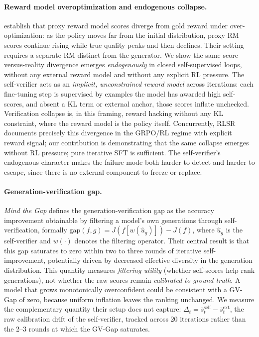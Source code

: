 \documentclass{article}
\begin{document}
\paragraph{Reward model overoptimization and endogenous collapse.}
\citet{gao2023scaling} establish that proxy reward model scores diverge from
gold reward under over-optimization: as the policy moves far from the
initial distribution, proxy RM scores continue rising while true quality peaks
and then declines.
Their setting requires a separate RM distinct from the generator.
We show the same score-versus-reality divergence emerges \emph{endogenously} in closed
self-supervised loops, without any external reward model and without any explicit RL
pressure.
The self-verifier acts as an \emph{implicit, unconstrained reward model} across
iterations: each fine-tuning step is supervised by examples the model has awarded high
self-scores, and absent a KL term or external anchor, those scores inflate unchecked.
Verification collapse is, in this framing, reward hacking
\citep{skalse2022defining} without any KL constraint, where the reward model is the
policy itself.
Concurrently, RLSR \citep{rlsr2025} documents precisely this divergence in the
GRPO/RL regime with explicit reward signal; our contribution is demonstrating that the
same collapse emerges without RL pressure; pure iterative SFT is sufficient.
The self-verifier's endogenous character makes the failure mode both harder to detect and
harder to escape, since there is no external component to freeze or replace.

\paragraph{Generation-verification gap.}
\emph{Mind the Gap} \citep{song2025mindthegap} defines the generation-verification gap as
the accuracy improvement obtainable by filtering a model's own generations through
self-verification, formally $\text{gap}(f,g) = J(f[w(\hat{u}_g)]) - J(f)$, where
$\hat{u}_g$ is the self-verifier and $w(\cdot)$ denotes the filtering operator.
Their central result is that this gap saturates to zero within two to three rounds of
iterative self-improvement, potentially driven by decreased effective diversity in the
generation distribution.
This quantity measures \emph{filtering utility} (whether self-scores help rank
generations), not whether the raw scores remain \emph{calibrated to ground truth}.
A model that grows monotonically overconfident could be consistent with a GV-Gap of
zero, because uniform inflation leaves the ranking unchanged.
We measure the complementary quantity their setup does not capture:
$\Delta_t = \bar{s}_t^{\text{self}} - \bar{s}_t^{\text{ext}}$, the raw calibration
drift of the self-verifier, tracked across 20 iterations rather than the 2--3 rounds
at which the GV-Gap saturates.
\end{document}
